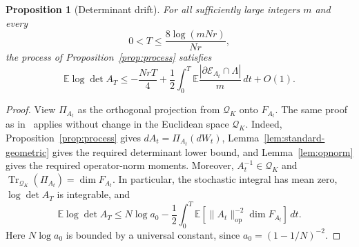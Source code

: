 \documentclass[11pt]{article}
\newtheorem{proposition}[theorem]{Proposition}
\theoremstyle{remark}
\newcommand{\Tr}{\operatorname{Tr}}
\newcommand{\E}{\mathbb E}
\newcommand{\op}{\operatorname{op}}
\newcommand{\calE}{\mathcal E}
\begin{document}
\begin{proposition}[Determinant drift]\label{prop:det-drift}
For all sufficiently large integers $m$ and every
\[
        0<T\le\frac{8\log(mNr)}{Nr},
\]
the process of Proposition~\ref{prop:process} satisfies
\[
        \E\log\det A_T
        \le -\frac{NrT}{4}
        +\frac12\int_0^T\E
        \frac{|\partial\calE_{A_t}\cap\Lambda|}{m}\,dt+O(1).
\]
\end{proposition}
\begin{proof}
View $\Pi_{A_t}$ as the orthogonal projection from $\mathcal Q_K$ onto
$F_{A_t}$.  The same proof as in~\cite{Klartag} applies without change in the
Euclidean space $\mathcal Q_K$.  Indeed, Proposition~\ref{prop:process}
gives $dA_t=\Pi_{A_t}(dW_t)$, Lemma~\ref{lem:standard-geometric} gives the
required determinant lower bound, and Lemma~\ref{lem:opnorm} gives the
required operator-norm moments.  Moreover, $A_t^{-1}\in\mathcal Q_K$ and
$\Tr_{\mathcal Q_K}(\Pi_{A_t})=\dim F_{A_t}$.  In particular, the stochastic
integral has mean zero, $\log\det A_T$ is integrable, and
\begin{equation}
        \E\log\det A_T
        \le N\log a_0
        -\frac12\int_0^T
          \E[\|A_t\|_{\op}^{-2}\dim F_{A_t}]\,dt.
\label{eq:det1}
\end{equation}
Here $N\log a_0$ is bounded by a universal constant, since $a_0=(1-1/N)^{-2}$.


\end{proof}
\end{document}
